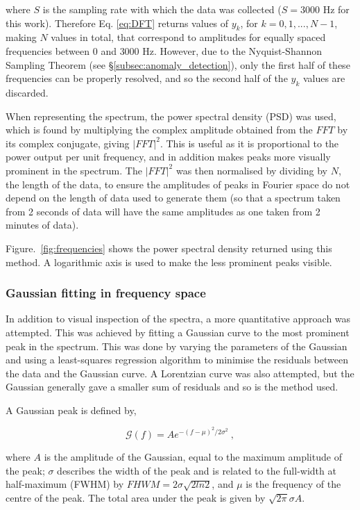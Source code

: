 where $S$ is the sampling rate with which the data was collected ($S=3000$ Hz for this work). Therefore Eq. \eqref{eq:DFT} returns values of $y_k$, for $k = 0,1,...,N-1$, making $N$ values in total, that correspond to amplitudes for equally spaced frequencies between $0$ and $3000$ Hz. However, due to the Nyquist-Shannon Sampling Theorem (see \S\ref{subsec:anomaly_detection}), only the first half of these frequencies can be properly resolved, and so the second half of the $y_k$ values are discarded.

When representing the spectrum, the power spectral density (PSD) was used, which is found by multiplying the complex amplitude obtained from the $FFT$ by its complex conjugate, giving $|FFT|^2$. This is useful as it is proportional to the power output per unit frequency, and in addition makes peaks more visually prominent in the spectrum. The $|FFT|^2$ was then normalised by dividing by $N$, the length of the data, to ensure the amplitudes of peaks in Fourier space do not depend on the length of data used to generate them (so that a spectrum taken from 2 seconds of data will have the same amplitudes as one taken from 2 minutes of data).

Figure.~\ref{fig:frequencies} shows the power spectral density returned using this method. A logarithmic axis is used to make the less prominent peaks visible.

\subsubsection{Gaussian fitting in frequency space}

In addition to visual inspection of the spectra, a more quantitative approach was attempted. This was achieved by fitting a Gaussian curve to the most prominent peak in the spectrum. This was done by varying the parameters of the Gaussian and using a least-squares regression algorithm to minimise the residuals between the data and the Gaussian curve. A Lorentzian curve was also attempted, but the Gaussian generally gave a smaller sum of residuals and so is the method used. 

A Gaussian peak is defined by,

\begin{equation}
   \mathcal{G}(f) = A e^{-(f-\mu)^2/2\sigma^2}~,
    \label{eq:gaussian}
\end{equation}

where $A$ is the amplitude of the Gaussian, equal to the maximum amplitude of the peak; $\sigma$ describes the width of the peak and is related to the full-width at half-maximum (FWHM) by $FHWM = 2\sigma \sqrt{2ln2}$, and $\mu$ is the frequency of the centre of the peak. The total area under the peak is given by $\sqrt{2\pi}\sigma A$.


